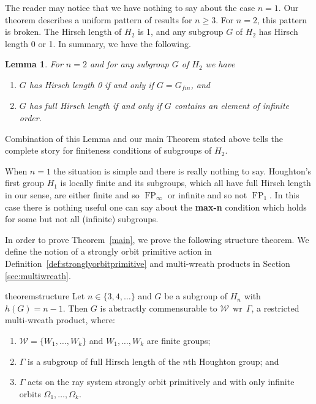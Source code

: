 \documentclass[11pt,a4paper]{amsart}
\newtheorem{lemma}[theorem]{Lemma}
\theoremstyle{definition}
\theoremstyle{remark}
\newcommand{\fpinfty}{{\FP}_{\infty}}
\newcommand{\FP}{\operatorname{FP}}
\newcommand{\gfin}{G_{\textit{fin}}}
\renewcommand{\wr}{\operatorname{\,wr\,}}
\begin{document}
The reader may notice that we have nothing to say about the case $n=1$. Our theorem describes a uniform pattern of results for $n\ge3$.
For $n=2$, this pattern is broken.
The Hirsch length of $H_2$ is 1, and any subgroup $G$ of $H_2$ has Hirsch length 0 or 1. In summary, we have the following.
\begin{lemma} For $n=2$ and for any subgroup $G$ of $H_2$ we have
\begin{enumerate}
\item $G$ has Hirsch length 0 if and only if $G=\gfin$, and
\item $G$ has full Hirsch length if and only if $G$ contains an element of infinite order.
\end{enumerate}
\end{lemma}
Combination of this Lemma and our main Theorem stated above tells the complete story for finiteness conditions of subgroups of $H_2$.

When $n=1$ the situation is simple and there is really nothing to say. Houghton's first group $H_1$ is locally finite and its subgroups, which all have full Hirsch length in our sense, are either finite and so $\fpinfty$ or infinite and so not $\FP_1$. In this case there is nothing useful one can say about the \textbf{max-n} condition which holds for some but not all (infinite) subgroups.

In order to prove Theorem~\ref{main}, we prove the following structure theorem. We define the notion of a strongly orbit primitive action in Definition~\ref{def:stronglyorbitprimitive} and multi-wreath products in Section \ref{sec:multiwreath}.\\

\begin{restatable*}{theorem}{structure}  \label{thm:structure}
Let $n\in \{3, 4, \ldots\}$ and $G$ be a subgroup of $H_n$ with $h(G)=n-1$. Then $G$ is abstractly commensurable to $\mathcal{W} \wr \Gamma$, a restricted multi-wreath product, where:
\begin{enumerate}
	\item $\mathcal{W}=\{W_1, \ldots, W_k\}$ and $W_1, \ldots, W_k$ are finite groups;
	\item $\Gamma$ is a subgroup of full Hirsch length of the $n$th Houghton group; and
	\item $\Gamma$ acts on the ray system strongly orbit primitively and with only infinite orbits $\Omega_1, \ldots, \Omega_k$.
\end{enumerate}
\end{restatable*}
\end{document}
